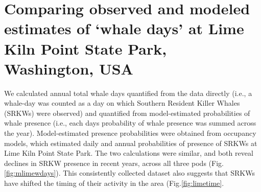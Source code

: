 \documentclass{article}
\begin{document}
\section* {Comparing observed and modeled estimates of `whale days' at Lime Kiln Point State Park, Washington, USA}
\par We calculated annual total whale days quantified from the data directly (i.e., a whale-day was counted as a day on which Southern Resident Killer Whales (SRKWs) were observed) and quantified from model-estimated probabilities of whale presence (i.e., each days probability of whale presence was summed across the year). Model-estimated presence probabilities were obtained from occupancy models, which estimated daily and annual probabilities of presence of SRKWs at Lime Kiln Point State Park. The two calculations were similar, and both reveal declines in SRKW presence in recent years, across all three pods (Fig. \ref{fig:mlimewdays}). This consistently collected dataset also suggests that SRKWs have shifted the timing of their activity in the area (Fig.\ref{fig:limetime}.
\end{document}

